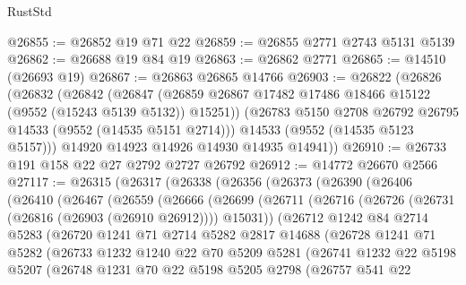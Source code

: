 \begin{lexlean}{RustStd}
\begin{coremodule}
@26855 := @26852 @19 @71 @22
@26859 := @26855 @2771 @2743 @5131 @5139
@26862 := @26688 @19 @84 @19
@26863 := @26862 @2771
@26865 := @14510 (@26693 @19)
@26867 := @26863 @26865 @14766
@26903 := @26822
    (@26826
      (@26832
        (@26842
          (@26847 (@26859 @26867 @17482 @17486 @18466 @15122 (@9552 (@15243 @5139 @5132)) @15251))
          (@26783 @5150 @2708 @26792 @26795 @14533 (@9552 (@14535 @5151 @2714)))
          @14533
          (@9552 (@14535 @5123 @5157)))
        @14920
        @14923
        @14926
        @14930
        @14935
        @14941))
@26910 := @26733 @191 @158 @22 @27 @2792 @2727 @26792
@26912 := @14772 @26670 @2566
@27117 := @26315
    (@26317
      (@26338
        (@26356
          (@26373
            (@26390
              (@26406
                (@26410
                  (@26467
                    (@26559
                      (@26666
                        (@26699
                          (@26711
                            (@26716 (@26726 (@26731 (@26816 (@26903 (@26910 @26912)))) @15031))
                            (@26712
                              @1242
                              @84
                              @2714
                              @5283
                              (@26720
                                @1241
                                @71
                                @2714
                                @5282
                                @2817
                                @14688
                                (@26728
                                  @1241
                                  @71
                                  @5282
                                  (@26733
                                    @1232
                                    @1240
                                    @22
                                    @70
                                    @5209
                                    @5281
                                    (@26741
                                      @1232
                                      @22
                                      @5198
                                      @5207
                                      (@26748
                                        @1231
                                        @70
                                        @22
                                        @5198
                                        @5205
                                        @2798
                                        (@26757
                                          @541
                                          @22

\end{coremodule}
\end{lexlean}
